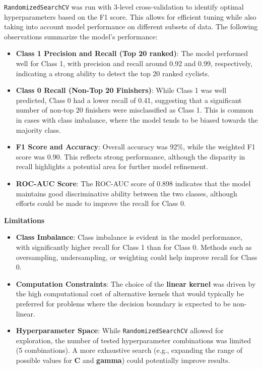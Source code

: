 \documentclass[a4paper, twoside]{article}
\begin{document}
\texttt{RandomizedSearchCV} was run with 3-level cross-validation to identify optimal hyperparameters based on the F1 score. This allows for efficient tuning while also taking into account model performance on different subsets of data. The following observations summarize the model's performance:

\begin{itemize}[noitemsep]
    \item \textbf{Class 1 Precision and Recall (Top 20 ranked)}: The model performed well for Class 1, with precision and recall around 0.92 and 0.99, respectively, indicating a strong ability to detect the top 20 ranked cyclists.
    \item \textbf{Class 0 Recall (Non-Top 20 Finishers)}: While Class 1 was well predicted, Class 0 had a lower recall of 0.41, suggesting that a significant number of non-top 20 finishers were misclassified as Class 1. This is common in cases with class imbalance, where the model tends to be biased towards the majority class.
    \item \textbf{F1 Score and Accuracy}: Overall accuracy was 92\%, while the weighted F1 score was 0.90. This reflects strong performance, although the disparity in recall highlights a potential area for further model refinement.
    \item \textbf{ROC-AUC Score}: The ROC-AUC score of 0.898 indicates that the model maintains good discriminative ability between the two classes, although efforts could be made to improve the recall for Class 0.
\end{itemize}

\textbf{Limitations}

\begin{itemize}[noitemsep]
    \item \textbf{Class Imbalance}: Class imbalance is evident in the model performance, with significantly higher recall for Class 1 than for Class 0. Methods such as oversampling, undersampling, or weighting could help improve recall for Class 0.
    \item \textbf{Computation Constraints}: The choice of the \textbf{linear kernel} was driven by the high computational cost of alternative kernels that would typically be preferred for problems where the decision boundary is expected to be non-linear.
    \item \textbf{Hyperparameter Space}: While \texttt{RandomizedSearchCV} allowed for exploration, the number of tested hyperparameter combinations was limited (5 combinations). A more exhaustive search (e.g., expanding the range of possible values for \textbf{C} and \textbf{gamma}) could potentially improve results.
\end{itemize}
\end{document}
